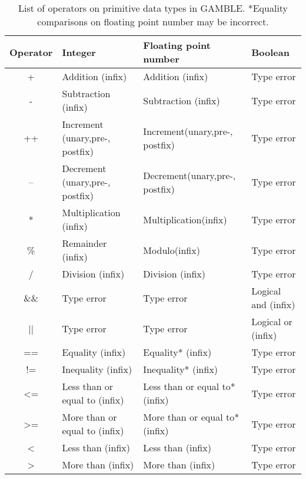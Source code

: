 \begin{table}[h]
    \centering
    \begin{tabular}{|c|l|l|l|}
    \hline
    \textbf{Operator}  & \textbf{Integer}                   & \textbf{Floating point number}    & \textbf{Boolean}           \\ \hline
    +                  & Addition (infix)                   & Addition (infix)                  & Type error          \\ \hline 
    -                  & Subtraction (infix)                & Subtraction (infix)               & Type error          \\ \hline 
    ++                 & Increment (unary,pre-, postfix)    & Increment(unary,pre-, postfix)    & Type error   \\ \hline    
    --                 & Decrement (unary,pre-, postfix)    & Decrement(unary,pre-, postfix)    & Type error  \\ \hline
    *                  & Multiplication (infix)             & Multiplication(infix)             & Type error                  \\ \hline
    \%                 & Remainder (infix)                  & Modulo(infix)                     & Type error              \\ \hline
    /                  & Division (infix)                   & Division (infix)                  & Type error  \\ \hline
    \&\&               & Type error                         & Type error                        & Logical and (infix) \\ \hline 
    ||                 & Type error                         & Type error                        & Logical or (infix) \\ \hline 
    ==                 & Equality (infix)                   & Equality* (infix)                 & Type error \\ \hline 
    !=                 & Inequality (infix)                 & Inequality* (infix)               & Type error \\ \hline
    <=                 & Less than or equal to (infix)      & Less than or equal to* (infix)    & Type error \\ \hline
    >=                 & More than or equal to (infix)      & More than or equal to* (infix)    & Type error \\ \hline
    <                  & Less than (infix)                  & Less than (infix)                 & Type error \\ \hline
    >                  & More than (infix)                  & More than (infix)                 & Type error \\ \hline    


    \end{tabular}
    \caption{List of operators on primitive data types in GAMBLE. *Equality comparisons on floating point number may be incorrect.}
    \label{tbl:operators}
\end{table}
\vspace{-20pt}